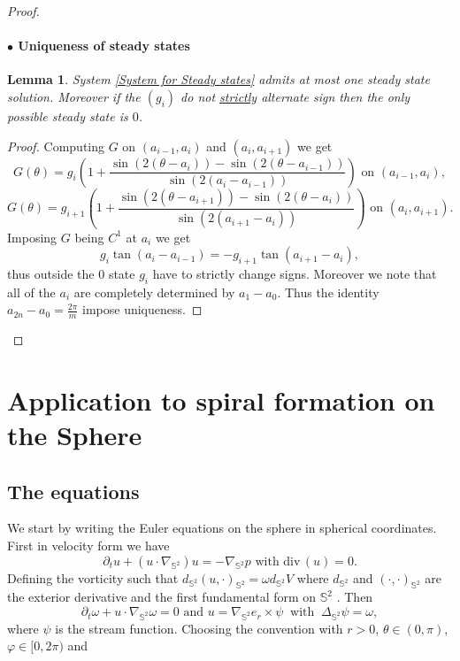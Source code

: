 \documentclass[10pt]{article}
\numberwithin{equation}{section}
\theoremstyle{plain}
\newtheorem{lemma}{Lemma}[section]
\theoremstyle{definition}
\newcommand{\prt}[1]{\left( #1 \right)}
\renewcommand{\div}{{\mbox{div}\,}}
\numberwithin{equation}{section}
\begin{document}
\begin{proof}
\paragraph{$\bullet$ Uniqueness of steady states}\begin{lemma}
System \eqref{System for Steady states} admits at most one steady state solution. Moreover if the $(g_i)$ do not \underline{strictly} alternate sign then the only possible steady state is $0$. 
\end{lemma}
\begin{proof}
Computing $G$ on $(a_{i-1},a_i)$ and $(a_{i},a_{i+1})$ we get 
\[
G(\theta)=g_{i}\prt{1+\frac{\sin\prt{2(\theta-a_i)}-\sin\prt{2(\theta-a_{i-1})}}{\sin\prt{2(a_i-a_{i-1})}}} \text{ on } (a_{i-1},a_i),
\]
\[
G(\theta)=g_{i+1}\prt{1+\frac{\sin\prt{2(\theta-a_{i+1})}-\sin\prt{2(\theta-a_{i})}}{\sin\prt{2(a_{i+1}-a_{i})}}} \text{ on } (a_{i},a_{i+1}).
\]
Imposing $G$ being $C^1$ at $a_i$ we get 
\[
g_i\tan(a_i-a_{i-1})=-g_{i+1}\tan(a_{i+1}-a_{i}),
\]
thus outside the $0$ state $g_i$ have to strictly change signs. Moreover we note that all of the $a_i$ are completely determined by $a_1-a_0$. Thus the identity $a_{2n}-a_0=\frac{2\pi}{m}$ impose uniqueness.
\end{proof}
\end{proof}


\section{Application to spiral formation on the Sphere}\label{sec:appl sphere}
\subsection{The equations}
We start by writing the Euler equations on the sphere in spherical coordinates. First in velocity form we have
\begin{equation*}
\partial_t u+(u\cdot \nabla_{\mathbb{S}^2})u=-\nabla_{\mathbb{S}^2} p \text{ with } \div(u)=0.
\end{equation*}
Defining the vorticity  such that $d_{\mathbb{S}^2}(u,\cdot)_{\mathbb{S}^2}=\omega d_{\mathbb{S}^2}V$ where $d_{\mathbb{S}^2}$ and $(\cdot,\cdot)_{\mathbb{S}^2}$ are the exterior derivative and the first fundamental form on $\mathbb{S}^2$ . Then 
\begin{equation*}
\partial_t \omega+u\cdot \nabla_{\mathbb{S}^2} \omega =0
\text{ and }
u=\nabla_{\mathbb{S}^2} e_r \times \psi \ \text{ with } \ \Delta_{\mathbb{S}^2} \psi =\omega,
\end{equation*}
where $\psi$ is the stream function.
Choosing the convention with $r>0$, $\theta \in (0,\pi)$, $\varphi \in [0,2\pi)$ and
\end{document}
